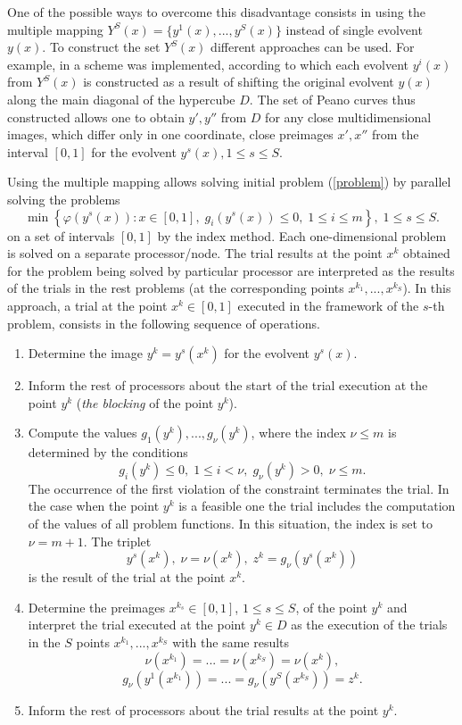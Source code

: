 \documentclass[smallextended]{svjour3}       %
\begin{document}
One of the possible ways to overcome this disadvantage consists in using the multiple mapping $Y^S(x)=\{ y^1 (x),...,y^S(x)\}$ instead of single evolvent $y(x)$. To construct the set $Y^S(x)$ different approaches can be used. For example, in \cite{Strongin2000} a scheme was implemented, according to which each evolvent $y^i(x)$ from $Y^S(x)$ is constructed as a result of shifting the original evolvent $y(x)$ along the main diagonal of the hypercube $D$. The set of Peano curves thus constructed allows one to obtain $y', y''$ from $D$ for any close multidimensional images, which differ only in one coordinate, close preimages $x', x''$ from the interval $[0,1]$ for the evolvent $y^s(x), 1\leq s \leq S$.

Using the multiple mapping allows solving initial problem (\ref{problem}) by parallel solving the problems
\[
\min \left\{\varphi(y^s(x)): x \in [0,1], \; g_i(y^s(x))\leq 0, \; 1 \leq i \leq m\right\},\; 1\leq s \leq S.
\]
on a set of intervals $[0,1]$ by the index method. Each one-dimensional problem is solved on a separate processor/node. The trial results at the point $x^k$ obtained for the problem being solved by particular processor are interpreted as the results of the trials in the rest problems (at the corresponding points $x^{k_1},...,x^{k_S}$). In this approach, a trial at the point $x^k \in [0,1]$ executed in the framework of the $s$-th problem, consists in the following sequence of operations.

\begin{enumerate}
	
	\item Determine the image $y^k=y^s(x^k)$ for the evolvent $y^s(x)$.
	
	\item Inform the rest of processors about the start of the trial execution at the point $y^k$ (\textit{the blocking} of the point $y^k$).
	
	\item Compute the values $g_1(y^k),...,g_\nu(y^k)$, where the index $\nu \leq m$ is determined by the conditions
	\[
		g_i(y^k)\leq 0, \; 1 \leq i < \nu, \; g_\nu(y^k)>0, \; \nu \leq m.
	\]
The occurrence of the first violation of the constraint terminates the trial. In the case when the point $y^k$ is a feasible one the trial includes the computation of the values of all problem functions. In this situation, the index is set to $\nu=m+1$. The triplet
\[
y^s(x^k), \; \nu=\nu(x^k), \; z^k=g_\nu(y^s(x^k))
\]
is the result of the trial at the point $x^k$.

\item Determine the preimages $x^{k_s} \in [0,1]$, $1 \leq s \leq S$, of the point $y^k$ and interpret the trial executed at the point $y^k \in D$ as the execution of the trials in the $S$ points  $x^{k_1},...,x^{k_S}$ with the same results
\[
 \nu(x^{k_1}) = ... = \nu(x^{k_S}) = \nu(x^k),
\]
\[
 g_\nu(y^1(x^{k_1})) = ... = g_\nu(y^S(x^{k_S})) = z^k.
\]

\item Inform the rest of processors about the trial results at the point $y^k$.
	
\end{enumerate}
\end{document}
